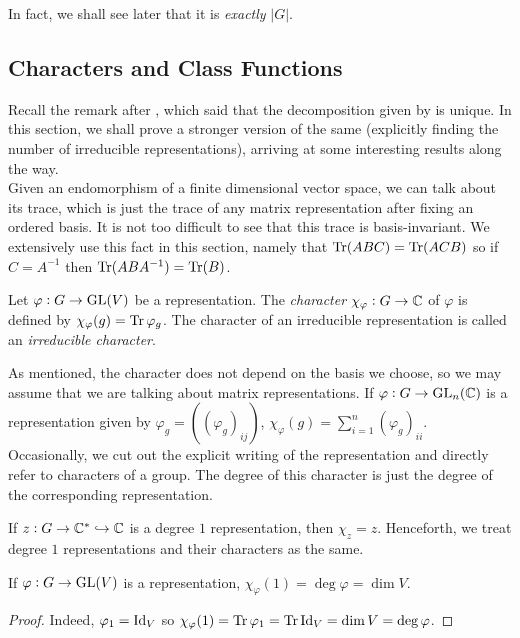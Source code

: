 		In fact, we shall see later that it is \emph{exactly} $|G|$.

	\subsection{Characters and Class Functions}

		Recall the remark after , which said that the decomposition given by  is unique. In this section, we shall prove a stronger version of the same (explicitly finding the number of irreducible representations), arriving at some interesting results along the way.\\
		Given an endomorphism of a finite dimensional vector space, we can talk about its trace, which is just the trace of any matrix representation after fixing an ordered basis. It is not too difficult to see that this trace is basis-invariant. We extensively use this fact in this section, namely that $\operatorname{Tr}(ABC) = \operatorname{Tr}(ACB)$ so if $C = A^{-1}$ then $\operatorname{Tr}(ABA^{-1}) = \operatorname{Tr}(B)$.

		\begin{fdef}[Character]
			Let $\varphi : G \to \operatorname{GL}(V)$ be a representation. The \emph{character} $\chi_\varphi : G \to \mathbb{C}$ of $\varphi$ is defined by $\chi_{\varphi}(g) = \operatorname{Tr} \varphi_g$. The character of an irreducible representation is called an \emph{irreducible character}.
		\end{fdef}

		As mentioned, the character does not depend on the basis we choose, so we may assume that we are talking about matrix representations. If $\varphi : G \to \operatorname{GL}_n(\mathbb{C})$ is a representation given by $\varphi_g = ((\varphi_g)_{ij})$, $\chi_\varphi(g) = \sum_{i=1}^n (\varphi_g)_{ii}$.\\

		Occasionally, we cut out the explicit writing of the representation and directly refer to characters of a group. The degree of this character is just the degree of the corresponding representation.

		\begin{remark}
			If $z : G \to \mathbb{C}^* \hookrightarrow \mathbb{C}$ is a degree $1$ representation, then $\chi_z = z$. Henceforth, we treat degree $1$ representations and their characters as the same.
		\end{remark}

		\begin{prop}
			If $\varphi : G \to \operatorname{GL}(V)$ is a representation, $\chi_\varphi(1) = \deg \varphi = \dim V$.
		\end{prop}
		\begin{proof}
			Indeed, $\varphi_1 = \operatorname{Id}_V$ so $\chi_\varphi(1) = \operatorname{Tr} \varphi_1 = \operatorname{Tr} \operatorname{Id}_V = \dim V = \deg \varphi$.
		\end{proof}

